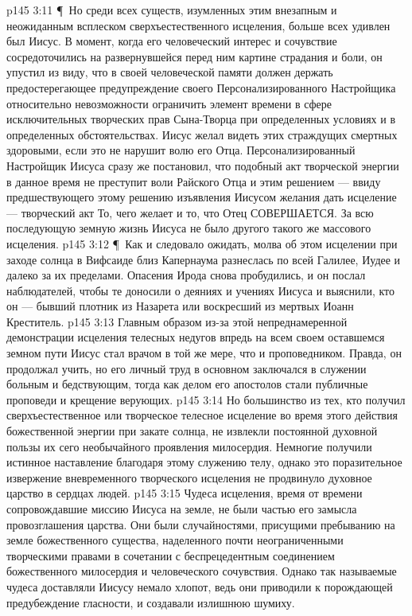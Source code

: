 \vs p145 3:11 \P\ Но среди всех существ, изумленных этим внезапным и неожиданным всплеском сверхъестественного исцеления, больше всех удивлен был Иисус. В момент, когда его человеческий интерес и сочувствие сосредоточились на развернувшейся перед ним картине страдания и боли, он упустил из виду, что в своей человеческой памяти должен держать предостерегающее предупреждение своего Персонализированного Настройщика относительно невозможности ограничить элемент времени в сфере исключительных творческих прав Сына\hyp{}Творца при определенных условиях и в определенных обстоятельствах. Иисус желал видеть этих страждущих смертных здоровыми, если это не нарушит волю его Отца. Персонализированный Настройщик Иисуса сразу же постановил, что подобный акт творческой энергии в данное время не преступит воли Райского Отца и этим решением --- ввиду предшествующего этому решению изъявления Иисусом желания дать исцеление --- творческий акт  То, чего желает  и то, что Отец  СОВЕРШАЕТСЯ. За всю последующую земную жизнь Иисуса не было другого такого же массового исцеления.
\vs p145 3:12 \P\ Как и следовало ожидать, молва об этом исцелении при заходе солнца в Вифсаиде близ Капернаума разнеслась по всей Галилее, Иудее и далеко за их пределами. Опасения Ирода снова пробудились, и он послал наблюдателей, чтобы те доносили о деяниях и учениях Иисуса и выяснили, кто он --- бывший плотник из Назарета или воскресший из мертвых Иоанн Креститель.
\vs p145 3:13 Главным образом из\hyp{}за этой непреднамеренной демонстрации исцеления телесных недугов впредь на всем своем оставшемся земном пути Иисус стал врачом в той же мере, что и проповедником. Правда, он продолжал учить, но его личный труд в основном заключался в служении больным и бедствующим, тогда как делом его апостолов стали публичные проповеди и крещение верующих.
\vs p145 3:14 Но большинство из тех, кто получил сверхъестественное или творческое телесное исцеление во время этого действия божественной энергии при закате солнца, не извлекли постоянной духовной пользы их сего необычайного проявления милосердия. Немногие получили истинное наставление благодаря этому служению телу, однако это поразительное извержение вневременного творческого исцеления не продвинуло духовное царство в сердцах людей.
\vs p145 3:15 Чудеса исцеления, время от времени сопровождавшие миссию Иисуса на земле, не были частью его замысла провозглашения царства. Они были случайностями, присущими пребыванию на земле божественного существа, наделенного почти неограниченными творческими правами в сочетании с беспрецедентным соединением божественного милосердия и человеческого сочувствия. Однако так называемые чудеса доставляли Иисусу немало хлопот, ведь они приводили к порождающей предубеждение гласности, и создавали излишнюю шумиху.
